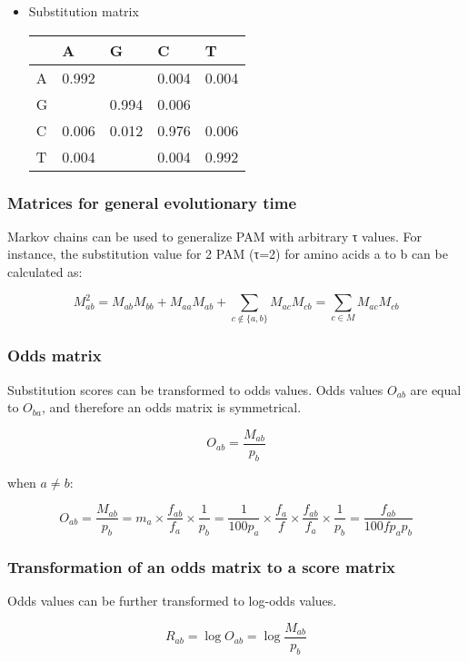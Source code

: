 \begin{itemize}
\item Substitution matrix

\begin{table}[H]
\centering
\begin{tabular}{l|llll}
  & A     & G     & C     & T     \\ \hline
A & 0.992 &       & 0.004 & 0.004 \\
G &       & 0.994 & 0.006 &       \\
C & 0.006 & 0.012 & 0.976 & 0.006 \\
T & 0.004 &       & 0.004 & 0.992
\end{tabular}
\end{table}

\end{itemize}

%
%
\subsubsection*{Matrices for general evolutionary time}
Markov chains can be used to generalize PAM with arbitrary τ values. For instance, the substitution value for 2 PAM (τ=2) for amino acids a to b can be calculated as:

\[
M_{ab}^2 = M_{ab} M_{bb} + M_{aa} M_{ab} + \sum_{c \notin \{a, b\}}{} M_{ac} M_{cb} = \sum_{c \in M}{} M_{ac} M_{cb}
\]

%
%
\subsubsection*{Odds matrix}
Substitution scores can be transformed to odds values. Odds values $O_{ab}$ are equal to $O_{ba}$, and therefore an odds matrix is symmetrical.

\[
O_{ab} = \dfrac{M_{ab}}{p_b}
\]

when $a \neq b$:

\[
O_{ab} 
= \dfrac{M_{ab}}{p_b} 
= m_a \times \dfrac{f_{ab}}{f_a} \times \dfrac{1}{p_b} 
= \dfrac{1}{100p_a} \times \dfrac{f_{a}}{f}  \times \dfrac{f_{ab}}{f_a} \times \dfrac{1}{p_b} 
= \dfrac{f_{ab}}{100fp_ap_b}
\]

%
%
\subsubsection*{Transformation of an odds matrix to a score matrix}
Odds values can be further transformed to log-odds values.

\[
R_{ab} = \log O_{ab} = \log \dfrac{M_{ab}}{p_b}
\]

\bigskip 

%
